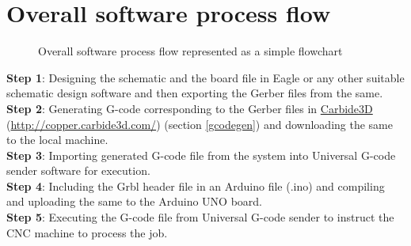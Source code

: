 \section{Overall software process flow}


\begin{figure}[h]
 \centering
 \caption{Overall software process flow represented as a simple flowchart}
 \label{fig:soft_process_flow}
\end{figure}


\hspace{-13.7mm}
\textbf{Step 1}: Designing the schematic and the board file in Eagle or any other suitable schematic design software and then exporting the Gerber files from the same. \\[5mm]
\textbf{Step 2}: Generating G-code corresponding to the Gerber files in \href{http://copper.carbide3d.com/}{Carbide3D} (\url{http://copper.carbide3d.com/}) (section \ref{gcodegen}) and downloading the same to the local machine. \\[5mm]
\textbf{Step 3}: Importing generated G-code file from the system into Universal G-code sender software for execution. \\[5mm]
\textbf{Step 4}: Including the Grbl header file in an Arduino file (.ino) and compiling and uploading the same to the Arduino UNO board. \\[5mm]
\textbf{Step 5}: Executing the G-code file from Universal G-code sender to instruct the CNC machine to process the job.
